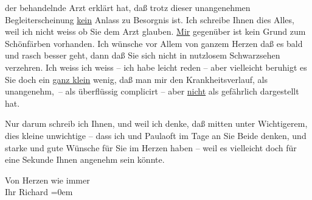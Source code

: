                der behandelnde Arzt erklärt
               hat, daß trotz dieser unangenehmen Begleiterscheinung \uline{kein} Anlass zu Besorgnis ist. Ich schreibe Ihnen dies Alles, weil ich {\pb}nicht weiss ob Sie dem Arzt glauben. \uline{Mir} gegenüber ist kein Grund zum Schönfärben
               vorhanden. Ich wünsche vor Allem von ganzem Herzen daß es bald und rasch {\pb}besser geht, dann daß Sie sich
               nicht in nutzlosem Schwarzsehen  verzehren. Ich
               weiss ich weiss – ich habe leicht reden – aber vielleicht beruhigt es Sie doch ein
                  \uline{ganz klein} wenig, daß man mir den
               Krankheitsverlauf, als unangenehm, – als überflüssig complicirt – aber \uline{nicht} als gefährlich dargestellt hat.\pend
           
\pstart
           {\pb}Nur darum schreib ich Ihnen, und
               weil ich denke, daß mitten unter Wichtigerem, dies kleine unwichtige – dass ich und
                  Paulaoft im Tage an Sie Beide denken,
               und starke und gute Wünsche für Sie im Herzen haben – weil es vielleicht doch für
               eine Sekunde Ihnen angenehm sein könnte.\pend
           
\pstart
           Von Herzen wie immer{\\[\baselineskip]}Ihr \spacefill\mbox{Richard}\pend
           \leftskip=0em{}\endnumbering{}  
      